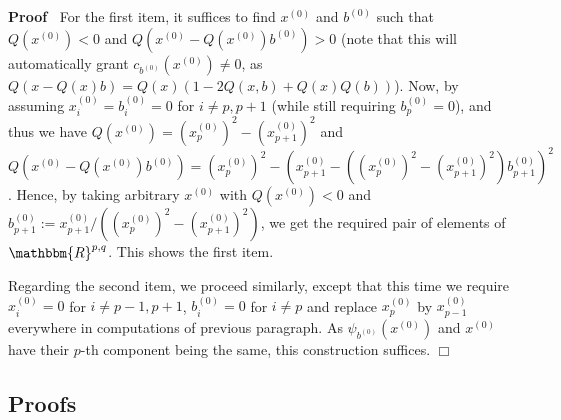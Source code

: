 \documentclass{article}
\newcommand{\assign}{:=}
\renewenvironment{proof}{\noindent\textbf{Proof\ }}{\hspace*{\fill}$\Box$\medskip}
\theoremstyle{remark}
\begin{document}
\begin{proof}
  For the first item, it suffices to find $x^{(0)}$ and $b^{(0)}$ such that $Q
  (x^{(0)}) < 0$ and $Q (x^{(0)} - Q (x^{(0)}) b^{(0)}) > 0$ (note that this
  will automatically grant $c_{b^{(0)}} (x^{(0)}) \neq 0$, as $Q (x - Q (x) b)
  = Q (x) (1 - 2 Q (x, b) + Q (x) Q (b))$). Now, by assuming $x_i^{(0)} =
  b^{(0)}_i = 0$ for $i \neq p, p + 1$ (while still requiring $b_p^{(0)} =
  0$), and thus we have $Q (x^{(0)}) = (x_p^{(0)})^2 - (x_{p + 1}^{(0)})^2$
  and $Q (x^{(0)} - Q (x^{(0)}) b^{(0)}) = (x_p^{(0)})^2 - (x_{p + 1}^{(0)} -
  ((x_p^{(0)})^2 - (x_{p + 1}^{(0)})^2) b^{(0)}_{p + 1})^2$. Hence, by taking
  arbitrary $x^{(0)}$ with $Q (x^{(0)}) < 0$ and $b_{p + 1}^{(0)} \assign x_{p
  + 1}^{(0)} / ((x_p^{(0)})^2 - (x_{p + 1}^{(0)})^2)$, we get the required
  pair of elements of $\mathbbm{R}^{p, q}$. This shows the first item.
  
  Regarding the second item, we proceed similarly, except that this time we
  require $x_i^{(0)} = 0$ for $i \neq p - 1, p + 1$, $b^{(0)}_i = 0$ for $i
  \neq p$ and replace $x_p^{(0)}$ by $x_{p - 1}^{(0)}$ everywhere in
  computations of previous paragraph. As $\psi_{b^{(0)}} (x^{(0)})$ and
  $x^{(0)}$ have their $p$-th component being the same, this construction
  suffices.
\end{proof}

\subsection{Proofs}
\end{document}
